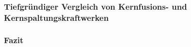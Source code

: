\subsubsection{Tiefgründiger Vergleich von Kernfusions- und Kernspaltungskraftwerken}
\subsubsection*{Fazit}